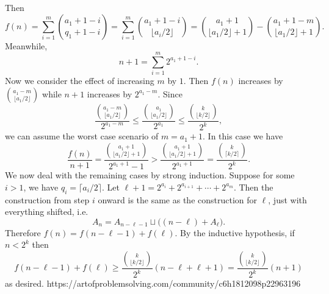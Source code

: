 {    Then
    \[f(n)=\sum_{i=1}^{m}\binom{a_1+1-i}{q_1+1-i}=\sum_{i=1}^{m}\binom{a_1+1-i}{\lfloor a_i/2\rfloor}=\binom{a_1+1}{\lfloor a_1/2\rfloor+1}-\binom{a_1+1-m}{\lfloor a_1/2\rfloor+1}.\]Meanwhile,
    \[n+1=\sum_{i=1}^{m}2^{a_1+1-i}.\]Now we consider the effect of increasing $m$ by $1$. Then $f(n)$ increases by $\binom{a_1-m}{\lfloor a_1/2\rfloor}$ while $n+1$ increases by $2^{a_1-m}$. Since
    \[\frac{\binom{a_1-m}{\lfloor a_1/2\rfloor}}{2^{a_1-m}}\leq \frac{\binom{a_1}{\lfloor a_1/2\rfloor}}{2^{a_1}}\leq \frac{\binom{k}{\lfloor k/2\rfloor}}{2^k},\]we can assume the worst case scenario of $m=a_1+1$. In this case we have
    \[\frac{f(n)}{n+1}=\frac{\binom{a_1+1}{\lfloor a_1/2\rfloor+1}}{2^{a_1+1}-1} > \frac{\binom{a_1+1}{\lfloor a_1/2\rfloor+1}}{2^{a_1+1}}=\frac{\binom{k}{\lceil k/2\rceil}}{2^k}.\]
    We now deal with the remaining cases by strong induction. Suppose for some $i > 1$, we have $q_i=\lceil a_i/2\rceil$. Let $\ell+1=2^{a_i}+2^{a_{i+1}}+\dotsb+2^{a_{m}}$. Then the construction from step $i$ onward is the same as the construction for $\ell$, just with everything shifted, i.e.
    \[A_n=A_{n-\ell-1}\sqcup \Big((n-\ell)+A_{\ell}\Big).\]Therefore $f(n)=f(n-\ell-1)+f(\ell)$. By the inductive hypothesis, if $n < 2^k$ then
    \[f(n-\ell-1)+f(\ell)\geq \frac{\binom{k}{\lfloor k/2\rfloor}}{2^k}(n-\ell+\ell+1)=\frac{\binom{k}{\lfloor k/2\rfloor}}{2^k}(n+1)\]as desired.
    }{%
    https://artofproblemsolving.com/community/c6h1812098p22963196
}

